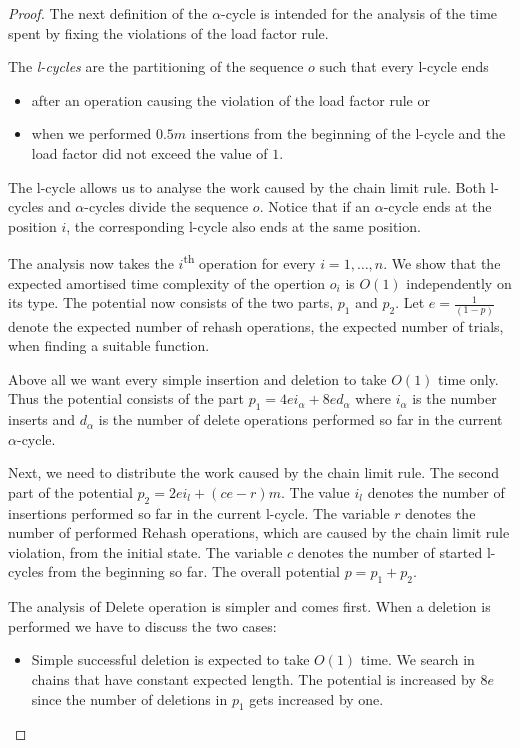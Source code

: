 \begin{proof}
The next definition of the $\alpha$-cycle is intended for the analysis of the time spent by fixing the violations of the load factor rule.

\begin{definition}[l-cycle]
The \emph{l-cycles} are the partitioning of the sequence $o$ such that every l-cycle ends 
\begin{itemize}
\item after an operation causing the violation of the load factor rule or
\item when we performed $0.5 m$ insertions from the beginning of the l-cycle and the load factor did not exceed the value of $1$.
\end{itemize}
\end{definition}
The l-cycle allows us to analyse the work caused by the chain limit rule. Both l-cycles and $\alpha$-cycles divide the sequence $o$. Notice that if an $\alpha$-cycle ends at the position $i$, the corresponding l-cycle also ends at the same position. 

The analysis now takes the $i$\textsuperscript{th} operation for every $i = 1, \dots, n$. We show that the expected amortised time complexity of the opertion $o_i$ is $O(1)$ independently on its type. The potential now consists of the two parts, $p_1$ and $p_2$. Let $e = \frac{1}{(1 - p)}$ denote the expected number of rehash operations, the expected number of trials, when finding a suitable function. 

Above all we want every simple insertion and deletion to take $O(1)$ time only. Thus the potential consists of the part $p_1 = 4ei_{\alpha} + 8ed_{\alpha}$ where $i_{\alpha}$ is the number inserts and $d_{\alpha}$ is the number of delete operations performed so far in the current $\alpha$-cycle. 

Next, we need to distribute the work caused by the chain limit rule. The second part of the potential $p_2 = 2ei_{l} + (ce - r) m$. The value $i_l$ denotes the number of insertions performed so far in the current l-cycle. The variable $r$ denotes the number of performed Rehash operations, which are caused by the chain limit rule violation, from the initial state. The variable $c$ denotes the number of started l-cycles from the beginning so far. The overall potential $p = p_1 + p_2$.

The analysis of Delete operation is simpler and comes first. When a deletion is performed we have to discuss the two cases:
\begin{itemize}
\item Simple successful deletion is expected to take $O(1)$ time. We search in chains that have constant expected length. The potential is increased by $8e$ since the number of deletions in $p_1$ gets increased by one.


\end{itemize}
\end{proof}
